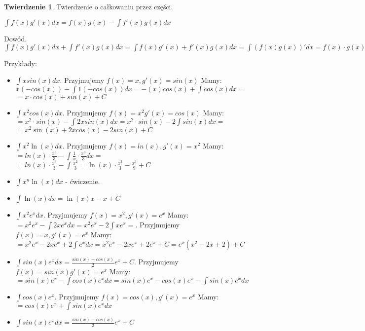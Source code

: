 \documentclass{article}
\theoremstyle{definition}
\theoremstyle{definition}
\newtheorem{tw}{Twierdzenie}[subsection]
\theoremstyle{definition}
\theoremstyle{definition}
\begin{document}
\begin{tw}
    Twierdzenie o całkowaniu przez części.
    \begin{center}
        $\int f(x) g'(x) dx = f(x) g(x) - \int f'(x) g(x) dx$
    \end{center}
    Dowód.\\
    $\int f(x) g'(x) dx + \int f'(x) g(x) dx = \int f(x)g'(x)+f'(x)g(x) dx = \int (f(x)g(x))' dx = f(x)\cdot g(x)$
\end{tw}
Przykłady:
\begin{itemize}
    \item $\int x sin(x) dx$. Przyjmujemy $f(x)=x, g'(x)=sin(x)$ Mamy:\\
    $x(-cos(x)) - \int 1(-cos(x)) dx = -(x)cos(x) + \int cos(x) dx=$\\
    $=x\cdot cos(x) + sin(x) + C$
    \item $\int x^2 cos(x) dx$. Przyjmujemy $f(x)=x^2 g'(x)=cos(x)$ Mamy:\\
    $=x^2\cdot sin(x) - \int 2x sin(x) dx = x^2 \cdot sin(x) - 2 \int sin(x)dx =$\\
    $=x^2\sin(x)+2xcos(x)-2sin(x)+C$
    \item $\int x^2 \ln(x) dx$. Przyjmujemy $f(x)=ln(x), g'(x)=x^2$ Mamy:\\
    $=ln(x)\cdot\frac{x^3}{3} - \int \frac{1}{x}\cdot\frac{x^3}{3} dx=$\\
    $=ln(x)\cdot\frac{x^3}{3} - \int \frac{x^2}{3} = \ln(x)\cdot\frac{x^3}{3} - \frac{x^3}{9} + C$
    \item $\int x^n \ln(x) dx$ - ćwiczenie.
    \item $\int \ln(x) dx = \ln(x)x-x+C$
    \item $\int x^2 e^x dx$. Przyjmujemy $f(x)=x^2, g'(x)=e^x$ Mamy:\\
    $=x^2e^x-\int 2xe^x dx = x^2e^x - 2\int xe^x =$. Przyjmujemy $f(x)=x, g'(x)=e^x$ Mamy:\\
    $=x^2e^x-2xe^x+2\int e^x dx = x^2e^x-2xe^x+2e^x+C=e^x(x^2-2x+2)+C$
    \item $\int sin(x)e^x dx = \frac{sin(x)-cos(x)}{2} e^x + C$. Przyjmujemy $f(x)=sin(x) g'(x)=e^x$ Mamy:\\
    $=sin(x)e^x - \int cos(x)e^x dx = sin(x)e^x - cos(x)e^x - \int sin(x)e^x dx$
    \item $\int cos(x)e^x$. Przyjmujemy $f(x)=cos(x), g'(x)=e^x$ Mamy:\\
    $=cos(x)e^x + \int sin(x)e^x dx$
    \item $\int sin(x)e^x dx = \frac{sin(x)-cos(x)}{2} e^x + C$ 
\end{itemize}
\end{document}
